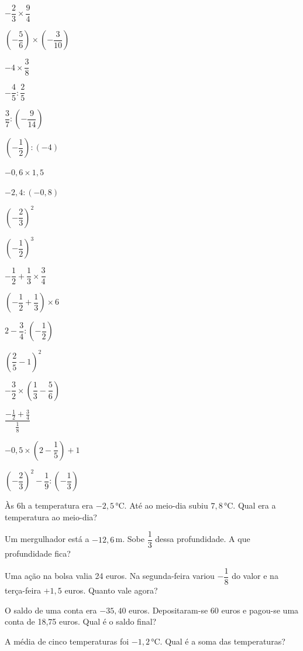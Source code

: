 \documentclass[12pt]{article}
\begin{document}
\begin{exercicios}
  \item $-\dfrac{2}{3} \times \dfrac{9}{4}$
  \item $\left(-\dfrac{5}{6}\right) \times \left(-\dfrac{3}{10}\right)$
  \item $-4 \times \dfrac{3}{8}$
  \item $-\dfrac{4}{5} : \dfrac{2}{5}$
  \item $\dfrac{3}{7} : \left(-\dfrac{9}{14}\right)$
  \item $\left(-\dfrac{1}{2}\right) : (-4)$
  \item $-0{,}6 \times 1{,}5$
  \item $-2{,}4 : (-0{,}8)$
  \item $\left(-\dfrac{2}{3}\right)^2$
  \item $\left(-\dfrac{1}{2}\right)^3$
\end{exercicios}

\begin{exercicios}
  \item $-\dfrac{1}{2} + \dfrac{1}{3} \times \dfrac{3}{4}$
  \item $\left(-\dfrac{1}{2} + \dfrac{1}{3}\right) \times 6$
  \item $2 - \dfrac{3}{4} : \left(-\dfrac{1}{2}\right)$
  \item $\left(\dfrac{2}{5} - 1\right)^2$
  \item $-\dfrac{3}{2} \times \left(\dfrac{1}{3} - \dfrac{5}{6}\right)$
  \item $\dfrac{-\frac{1}{2} + \frac{3}{4}}{\frac{1}{8}}$
  \item $-0{,}5 \times \left(2 - \dfrac{1}{5}\right) + 1$
  \item $\left(-\dfrac{2}{3}\right)^2 - \dfrac{1}{9} : \left(-\dfrac{1}{3}\right)$
\end{exercicios}

\begin{exercicios}
  \item Às 6h a temperatura era $-2{,}5$\,°C. Até ao meio-dia subiu $7{,}8$\,°C. Qual era a temperatura ao meio-dia?
  \item Um mergulhador está a $-12{,}6$\,m. Sobe $\dfrac{1}{3}$ dessa profundidade. A que profundidade fica?
  \item Uma ação na bolsa valia 24 euros. Na segunda-feira variou $-\dfrac{1}{8}$ do valor e na terça-feira $+1{,}5$ euros. Quanto vale agora?
  \item O saldo de uma conta era $-35{,}40$ euros. Depositaram-se 60 euros e pagou-se uma conta de 18,75 euros. Qual é o saldo final?
  \item A média de cinco temperaturas foi $-1{,}2$\,°C. Qual é a soma das temperaturas?
\end{exercicios}
\end{document}
